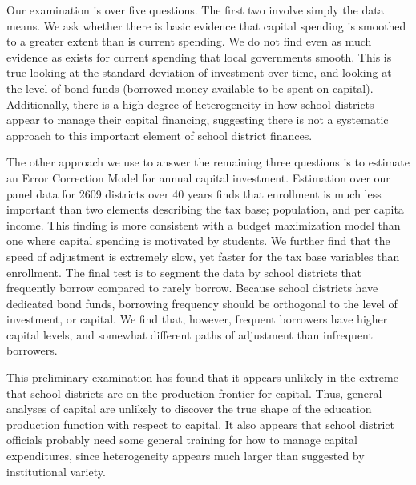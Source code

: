 Our examination is over five questions. The first two involve simply the data means. We ask whether there is basic evidence that capital spending is smoothed to a greater extent than is current spending. We do not find even as much evidence as exists for current spending that local governments smooth. This is true looking at the standard deviation of investment over time, and looking at the level of bond funds (borrowed money available to be spent on capital). Additionally, there is a high degree of heterogeneity in how school districts appear to manage their capital financing, suggesting there is not a systematic approach to this important element of school district finances.

The other approach we use to answer the remaining three questions is to estimate an Error Correction Model for annual capital investment. Estimation over our panel data for 2609 districts over 40 years finds that enrollment is much less important than two elements describing the tax base; population, and per capita income. This finding is more consistent with a budget maximization model than one where capital spending is motivated by students. We further find that the speed of adjustment is extremely slow, yet faster for the tax base variables than enrollment. The final test is to segment the data by school districts that frequently borrow compared to rarely borrow. Because school districts have dedicated bond funds, borrowing frequency should be orthogonal to the level of investment, or capital. We find that, however, frequent borrowers have higher capital levels, and somewhat different paths of adjustment than infrequent borrowers.

This preliminary examination has found that it appears unlikely in the extreme that school districts are on the production frontier for capital. Thus, general analyses of capital are unlikely to discover the true shape of the education production function with respect to capital. It also appears that school district officials probably need some general training for how to manage capital expenditures, since heterogeneity appears much larger than suggested by institutional variety.
